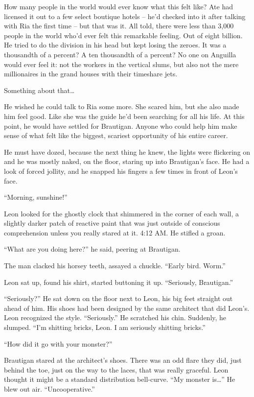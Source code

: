 How many people in the world would ever know what this felt like? Ate 
had licensed it out to a few select boutique hotels -- he'd checked 
into it after talking with Ria the first time -- but that was it. All 
told, there were less than 3,000 people in the world who'd ever felt 
this remarkable feeling. Out of eight billion. He tried to do the 
division in his head but kept losing the zeroes. It was a thousandth of 
a percent? A ten thousandth of a percent? No one on Anguilla would ever 
feel it: not the workers in the vertical slums, but also not the mere 
millionaires in the grand houses with their timeshare jets.

Something about that\ldots{}

He wished he could talk to Ria some more. She scared him, but she also 
made him feel good. Like she was the guide he'd been searching for all 
his life. At this point, he would have settled for Brautigan. Anyone 
who could help him make sense of what felt like the biggest, scariest 
opportunity of his entire career.

He must have dozed, because the next thing he knew, the lights were 
flickering on and he was mostly naked, on the floor, staring up into 
Brautigan's face. He had a look of forced jollity, and he snapped his 
fingers a few times in front of Leon's face.

“Morning, sunshine!”

Leon looked for the ghostly clock that shimmered in the corner of each 
wall, a slightly darker patch of reactive paint that was just outside 
of conscious comprehension unless you really stared at it. 4:12 AM. He 
stifled a groan.

“What are you doing here?” he said, peering at Brautigan.

The man clacked his horsey teeth, assayed a chuckle. “Early bird. 
Worm.”

Leon sat up, found his shirt, started buttoning it up. “Seriously, 
Brautigan.”

“Seriously?” He sat down on the floor next to Leon, his big feet 
straight out ahead of him. His shoes had been designed by the same 
architect that did Leon's. Leon recognized the style. “Seriously.” 
He scratched his chin. Suddenly, he slumped. “I'm shitting bricks, 
Leon. I am seriously shitting bricks.”

“How did it go with your monster?”

Brautigan stared at the architect's shoes. There was an odd flare they 
did, just behind the toe, just on the way to the laces, that was really 
graceful. Leon thought it might be a standard distribution bell-curve. 
“My monster is\ldots{}” He blew out air. “Uncooperative.”

